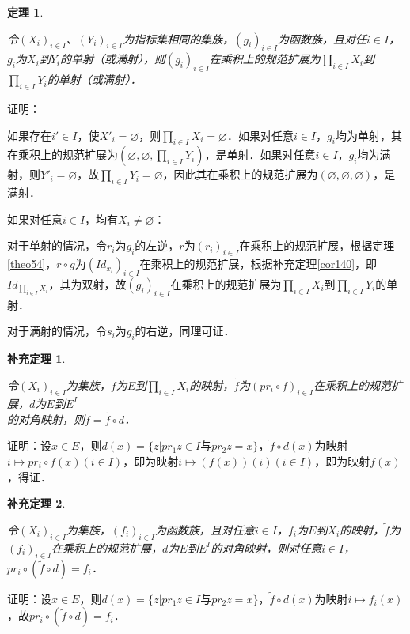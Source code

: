 \documentclass[12pt, a4paper, oneside]{book}
\newtheorem{theo}{定理}
\newtheorem{cor}{补充定理}
\begin{document}
			\begin{theo}\label{theo55}
				\hfill\par
				令$(X_i)_{i\in I}$、$(Y_i)_{i\in I}$为指标集相同的集族，$(g_i)_{i\in I}$为函数族，且对任$i\in I$，$g_i$为$X_i$到$Y_i$的单射（或满射），则$(g_i)_{i\in I}$在乘积上的规范扩展为$\prod\limits_{i\in I}X_i$到$\prod\limits_{i\in I}Y_i$的单射（或满射）．
			\end{theo}
			证明：
			\par
			如果存在$i'\in I$，使${X'}_i=\varnothing$，则$\prod\limits_{i\in I}X_i=\varnothing$．如果对任意$i\in I$，$g_i$均为单射，其在乘积上的规范扩展为$(\varnothing, \varnothing, \prod\limits_{i\in I}Y_i)$，是单射．如果对任意$i\in I$，$g_i$均为满射，则${Y'}_i=\varnothing$，故$\prod\limits_{i\in I}Y_i=\varnothing$，因此其在乘积上的规范扩展为$(\varnothing, \varnothing, \varnothing)$，是满射．
			\par
			如果对任意$i\in I$，均有$X_i\neq \varnothing$：
			\par
			对于单射的情况，令$r_i$为$g_i$的左逆，$r$为$(r_i)_{i\in I}$在乘积上的规范扩展，根据定理\ref{theo54}，$r\circ g$为$(Id_{x_i})_{i\in I}$在乘积上的规范扩展，根据补充定理\ref{cor140}，即$Id_{\prod\limits_{i\in I}X_i}$，其为双射，故$(g_i)_{i\in I}$在乘积上的规范扩展为$\prod\limits_{i\in I}X_i$到$\prod\limits_{i\in I}Y_i$的单射．
			\par
			对于满射的情况，令$s_i$为$g_i$的右逆，同理可证．
						
			\begin{cor}\label{cor142}
				\hfill\par
				令$(X_i)_{i\in I}$为集族，$f$为$E$到$\prod\limits_{i\in I}X_i$的映射，$\tilde{f}$为$(pr_i\circ f)_{i\in I}$在乘积上的规范扩展，$d$为$E$到$E^I$\\的对角映射，则$f=\tilde{f}\circ d$．
			\end{cor}
			证明：设$x\in E$，则$d(x)=\{z|pr_1z\in I\text{与}pr_2z=x\}$，$\tilde{f}\circ d(x)$为映射$i\mapsto pr_i\circ f(x)(i\in I)$，即为映射$i\mapsto (f(x))(i)(i\in I)$，即为映射$f(x)$，得证．
			
			\begin{cor}\label{cor143}
				\hfill\par
				令$(X_i)_{i\in I}$为集族，$(f_i)_{i\in I}$为函数族，且对任意$i\in I$，$f_i$为$E$到$X_i$的映射，$\tilde{f}$为$(f_i)_{i\in I}$在乘积上的规范扩展，$d$为$E$到$E^I$的对角映射，则对任意$i\in I$，$pr_i\circ (\tilde{f}\circ d)=f_i$．
			\end{cor}
			证明：设$x\in E$，则$d(x) =\{z|pr_1z\in I\text{与}pr_2z=x\}$，$\tilde{f}\circ d(x)$为映射$i\mapsto f_i(x)$，故$pr_i\circ (\tilde{f}\circ d)=f_i$．
			
\end{document}
